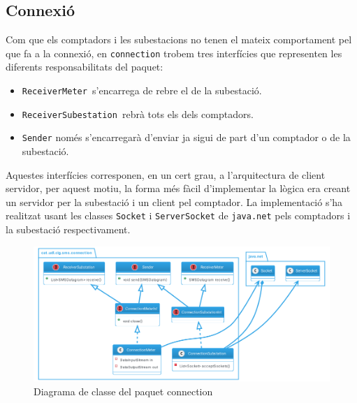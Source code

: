 \subsection{Connexió}
Com que els comptadors i les subestacions no tenen el mateix comportament pel que fa a la connexió, en \texttt{connection} trobem tres interfícies que representen les diferents responsabilitats del paquet:
\begin{itemize}
	\item \texttt{ReceiverMeter }s'encarrega de rebre el \dto de la subestació.
	\item \texttt{ReceiverSubestation }rebrà tots els \dto dels comptadors.
	\item \texttt{Sender} només s'encarregarà d'enviar \dto ja sigui de part d'un comptador o de la subestació.
\end{itemize}
Aquestes interfícies corresponen, en un cert grau, a l'arquitectura de client servidor, per aquest motiu, la forma més fàcil d'implementar la lògica era creant un servidor per la subestació i un client pel comptador.
La implementació s'ha realitzat usant les classes \texttt{Socket} i \texttt{ServerSocket} de \texttt{java.net} pels comptadors i la subestació respectivament.
\begin{figure}[H]
	\centering
	\includegraphics[width=16cm]{classes/connection.png}
	\caption{Diagrama de classe del paquet connection}
	\label{fig:connection}
\end{figure}
